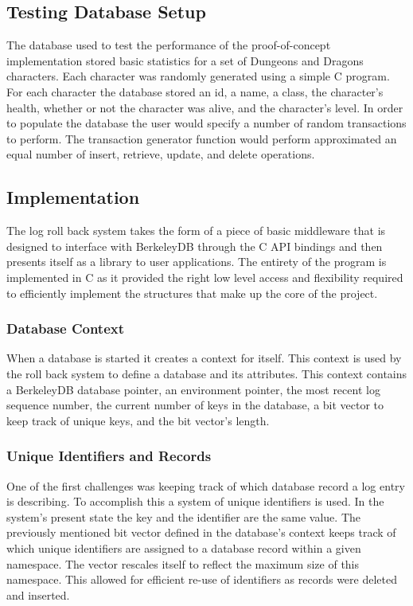 \documentclass{article}
\begin{document}
\subsection{Testing Database Setup}

The database used to test the performance of the proof-of-concept implementation stored basic statistics for a set of Dungeons and Dragons characters. Each character was randomly generated using a simple C program. For each character the database stored an id, a name, a class, the character's health, whether or not the character was alive, and the character's level. In order to populate the database the user would specify a number of random transactions to perform. The transaction generator function would perform approximated an equal number of insert, retrieve, update, and delete operations.

\subsection{Implementation}
The log roll back system takes the form of a piece of basic middleware that is designed to interface with BerkeleyDB through the C API bindings and then presents itself as a library to user applications. The entirety of the program is implemented in C as it provided the right low level access and flexibility required to efficiently implement the structures that make up the core of the project.

\subsubsection{Database Context}
When a database is started it creates a context for itself. This context is used by the roll back system to define a database and its attributes. This context contains a BerkeleyDB database pointer, an environment pointer, the most recent log sequence number, the current number of keys in the database, a bit vector to keep track of unique keys, and the bit vector's length. 

\subsubsection{Unique Identifiers and Records}
One of the first challenges was keeping track of which database record a log entry is describing. To accomplish this a system of unique identifiers is used. In the system's present state the key and the identifier are the same value. The previously mentioned bit vector defined in the database's context keeps track of which unique identifiers are assigned to a database record within a given namespace. The vector rescales itself to reflect the maximum size of this namespace. This allowed for efficient re-use of identifiers as records were deleted and inserted.
\end{document}
